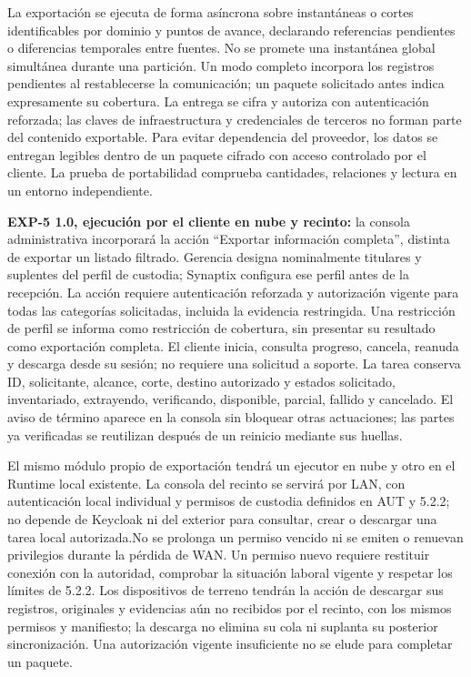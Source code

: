 La exportación se ejecuta de forma asíncrona sobre instantáneas o cortes identificables por dominio y puntos de avance, declarando referencias pendientes o diferencias temporales entre fuentes. No se promete una instantánea global simultánea durante una partición. Un modo completo incorpora los registros pendientes al restablecerse la comunicación; un paquete solicitado antes indica expresamente su cobertura. La entrega se cifra y autoriza con autenticación reforzada; las claves de infraestructura y credenciales de terceros no forman parte del contenido exportable. Para evitar dependencia del proveedor, los datos se entregan legibles dentro de un paquete cifrado con acceso controlado por el cliente. La prueba de portabilidad comprueba cantidades, relaciones y lectura en un entorno independiente.


\label{subsec:sd5_exportacion_autonoma}
\textbf{EXP-5 1.0, ejecución por el cliente en nube y recinto:} la consola administrativa incorporará la acción ``Exportar información completa'', distinta de exportar un listado filtrado. Gerencia designa nominalmente titulares y suplentes del perfil de custodia; Synaptix configura ese perfil antes de la recepción. La acción requiere autenticación reforzada y autorización vigente para todas las categorías solicitadas, incluida la evidencia restringida. Una restricción de perfil se informa como restricción de cobertura, sin presentar su resultado como exportación completa. El cliente inicia, consulta progreso, cancela, reanuda y descarga desde su sesión; no requiere una solicitud a soporte. La tarea conserva ID, solicitante, alcance, corte, destino autorizado y estados solicitado, inventariado, extrayendo, verificando, disponible, parcial, fallido y cancelado. El aviso de término aparece en la consola sin bloquear otras actuaciones; las partes ya verificadas se reutilizan después de un reinicio mediante sus huellas.

El mismo módulo propio de exportación tendrá un ejecutor en nube y otro en el Runtime local existente. La consola del recinto se servirá por LAN, con autenticación local individual y permisos de custodia definidos en AUT y 5.2.2; no depende de Keycloak ni del exterior para consultar, crear o descargar una tarea local autorizada.No se prolonga un permiso vencido ni se emiten o renuevan privilegios durante la pérdida de WAN. Un permiso nuevo requiere restituir conexión con la autoridad, comprobar la situación laboral vigente y respetar los límites de 5.2.2. Los dispositivos de terreno tendrán la acción de descargar sus registros, originales y evidencias aún no recibidos por el recinto, con los mismos permisos y manifiesto; la descarga no elimina su cola ni suplanta su posterior sincronización. Una autorización vigente insuficiente no se elude para completar un paquete.


